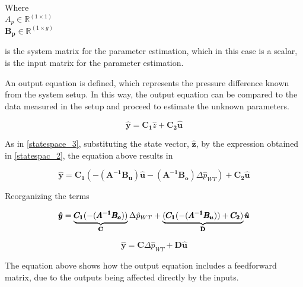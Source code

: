 \begin{minipage}[t]{0.20\textwidth}
Where\\
\hspace*{8mm} $A_p \in \mathbb{R}^{(1 \times 1)} $ \\
\hspace*{8mm} $\pmb{B_p} \in \pmb{\mathbb{R}}^{(1 \times g)} $ 
\end{minipage}
\begin{minipage}[t]{0.68\textwidth}
\vspace*{2mm}
is the system matrix for the parameter estimation, which in this case is a scalar, \\
is the input matrix for the parameter estimation.
\end{minipage} 

An output equation is defined, which represents the pressure difference known from the system setup. In this way, the output equation can be compared 
to the data measured in the setup and proceed to estimate the unknown parameters. 

\begin{equation}
\pmb{\hat{y}} = \pmb{C_{1}} \hat{z}  + \pmb{C_{2}}\pmb{\hat{u}}  
 \label{statespace_5}
\end{equation}

As in \eqref{statespace_3}, substituting the state vector, $\pmb{\hat{z}}$, by the expression obtained in \eqref{statespac_2}, the equation above results in 

\begin{equation}
\pmb{\hat{y}} = \pmb{C_{1}} (-(\pmb{A^{-1}}\pmb{B_u})\pmb{\hat{u}} - (\pmb{A^{-1}}\pmb{B_o})\Delta \hat{p}_{WT})  + \pmb{C_{2}}\pmb{\hat{u}}  
 \label{statespace_6}
\end{equation}

Reorganizing the terms

\begin{equation}
\pmb{\hat{y}} = \underbrace{\pmb{C_{1}} (-(\pmb{A^{-1}}\pmb{B_o}))}_\text{\pmb{C}} \Delta \hat{p}_{WT} + \underbrace{(\pmb{C_{1}} (-(\pmb{A^{-1}}\pmb{B_u})) + \pmb{C_{2}})}_\text{\pmb{D}}\pmb{\hat{u}}  
 \label{finaloutput}
\end{equation}

\begin{equation}
  \pmb{\hat{y}} = \pmb{C} \Delta \hat{p}_{WT} + \pmb{D} \pmb{\hat{u}} 
\end{equation}

The equation above shows how the output equation includes a feedforward matrix, due to the outputs being affected directly by the inputs.


